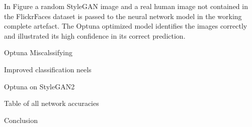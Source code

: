 In Figure a random StyleGAN image and a real human image not contained in the FlickrFaces dataset is passed to the neural network model in the working complete artefact. The Optuna optimized model identifies the images correctly and illustrated its high confidence in its correct prediction. 

Optuna Miscalssifying

Improved classification neels

Optuna on StyleGAN2

Table of all network accuracies

Conclusion

